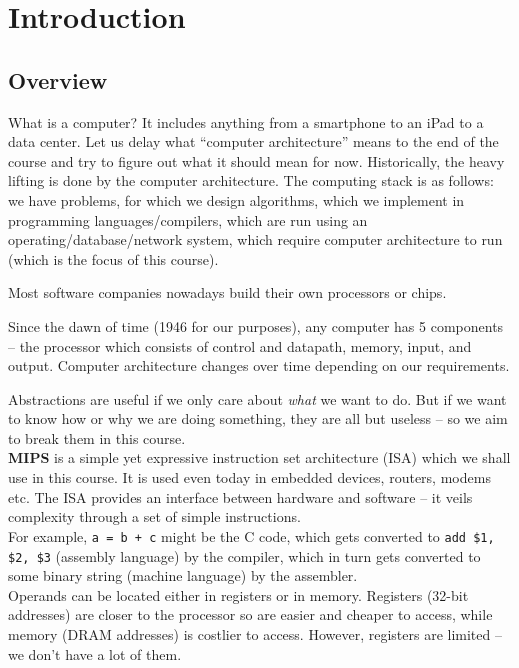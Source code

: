 \documentclass{article}
\begin{document}
\thispagestyle{empty}
\titleBC


\section{Introduction}

	\subsection{Overview}

		What is a computer? It includes anything from a smartphone to an iPad to a data center. Let us delay what ``computer architecture'' means to the end of the course and try to figure out what it should mean for now. Historically, the heavy lifting is done by the computer architecture. The computing stack is as follows: we have problems, for which we design algorithms, which we implement in programming languages/compilers, which are run using an operating/database/network system, which require computer architecture to run (which is the focus of this course).

		Most software companies nowadays build their own processors or chips.

		Since the dawn of time (1946 for our purposes), any computer has 5 components -- the processor which consists of control and datapath, memory, input, and output. Computer architecture changes over time depending on our requirements.

		Abstractions are useful if we only care about \emph{what} we want to do. But if we want to know how or why we are doing something, they are all but useless -- so we aim to break them in this course.\\

		\textbf{MIPS} is a simple yet expressive instruction set architecture (ISA) which we shall use in this course. It is used even today in embedded devices, routers, modems etc. The ISA provides an interface between hardware and software -- it veils complexity through a set of simple instructions.\\
		For example, \texttt{a = b + c} might be the C code, which gets converted to \texttt{add \$1, \$2, \$3} (assembly language) by the compiler, which in turn gets converted to some binary string (machine language) by the assembler.\\
		Operands can be located either in registers or in memory. Registers (32-bit addresses) are closer to the processor so are easier and cheaper to access, while memory (DRAM addresses) is costlier to access. However, registers are limited -- we don't have a lot of them.
\end{document}
